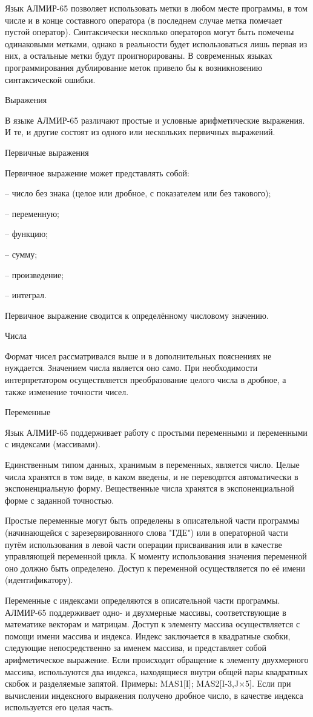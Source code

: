 \documentclass[11pt]{article}
\begin{document}
Язык АЛМИР-65 позволяет использовать
метки в любом месте программы, в том
числе и в конце составного оператора (в
последнем случае метка помечает пустой
оператор). Синтаксически несколько
операторов могут быть помечены
одинаковыми метками, однако в
реальности будет использоваться лишь
первая из них, а остальные метки будут
проигнорированы. В современных языках
программирования дублирование меток
привело бы к возникновению
синтаксической ошибки.

Выражения

В языке АЛМИР-65 различают простые и
условные арифметические выражения. И
те, и другие состоят из одного или
нескольких первичных выражений.

Первичные выражения

Первичное выражение может
представлять собой:

– число без знака (целое или дробное, с
показателем или без такового);

– переменную;

– функцию;

– сумму;

– произведение;

– интеграл.

Первичное выражение сводится к
определённому числовому значению.

Числа

Формат чисел рассматривался выше и в
дополнительных пояснениях не
нуждается. Значением числа является
оно само. При необходимости
интерпретатором осуществляется
преобразование целого числа в дробное,
а также изменение точности чисел.

Переменные

Язык АЛМИР-65 поддерживает работу с
простыми переменными и переменными с
индексами (массивами).

Единственным типом данных, хранимым в
переменных, является число. Целые числа
хранятся в том виде, в каком введены, и
не переводятся автоматически в
экспоненциальную форму. Вещественные
числа хранятся в экспоненциальной
форме с заданной точностью.

Простые переменные могут быть
определены в описательной части
программы (начинающейся с
зарезервированного слова "ГДЕ") или в
операторной части путём использования
в левой части операции присваивания
или в качестве управляющей переменной
цикла. К моменту использования
значения переменной оно должно быть
определено. Доступ к переменной
осуществляется по её имени
(идентификатору).

Переменные с индексами определяются в
описательной части программы. АЛМИР-65
поддерживает одно- и двухмерные
массивы, соответствующие в математике
векторам и матрицам. Доступ к элементу
массива осуществляется с помощи имени
массива и индекса. Индекс заключается в
квадратные скобки, следующие
непосредственно за именем массива, и
представляет собой арифметическое
выражение. Если происходит обращение к
элементу двухмерного массива,
используются два индекса, находящиеся
внутри общей пары квадратных скобок и
разделяемые запятой. Примеры: MAS1$[$I$]$;
MAS2$[$I-3,J×5$]$. Если при вычислении
индексного выражения получено дробное
число, в качестве индекса используется
его целая часть.
\end{document}
